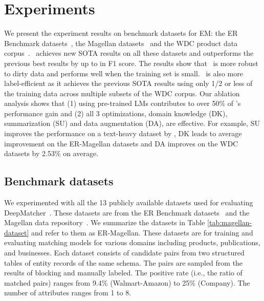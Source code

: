 
\newcommand{\green}[1]{{\textcolor{ForestGreen}{{#1}}}}
\newcommand{\red}[1]{{\textcolor{RubineRed}{{#1}}}}

\vspace{-1mm}
\section{Experiments}\label{sec:experiments}
We present the experiment results on benchmark datasets for EM:
the ER Benchmark datasets~\cite{kopcke2010evaluation},
the Magellan datasets~\cite{Konda:2016:Magellan} and the WDC product data corpus~\cite{Primpeli:2019:WDC}.
\system\ achieves new SOTA results on all these datasets and outperforms the previous best results
by up to  in F1 score.
The results show that \system\ is more robust to dirty data and performs well when the training set is small.
\system\ is also more label-efficient as it achieves the previous SOTA results using 
only 1/2 or less of the training data across multiple subsets of the WDC corpus.
Our ablation analysis shows that 
(1) using pre-trained LMs contributes to over 50\% of \system's performance gain and
(2) all 3 optimizations, domain knowledge (DK), summarization (SU) and data augmentation (DA),
are effective.
For example, SU improves the performance on a text-heavy dataset by ,
DK leads to  average improvement on the ER-Magellan datasets and
DA improves on the WDC datasets by 2.53\% on average. 





\vspace{-1mm}
\subsection{Benchmark datasets}

We experimented with all the 13 publicly available datasets used for evaluating 
DeepMatcher~\cite{Mudgal:2018:DeepMatcher}. These datasets
are from the ER Benchmark datasets~\cite{kopcke2010evaluation} and 
the Magellan data repository~\cite{magellandata}.
We summarize the datasets in Table \ref{tab:magellan-dataset}
and refer to them as ER-Magellan.
These datasets are for training and evaluating matching models for various domains
including products, publications, and businesses.
Each dataset consists of candidate pairs from two structured tables of entity records of the same schema. 
The pairs are sampled from the results of blocking and manually labeled.
The positive rate (i.e., the ratio of matched pairs) ranges from 9.4\% (Walmart-Amazon) to 25\% (Company).
The number of attributes ranges from 1 to 8.

